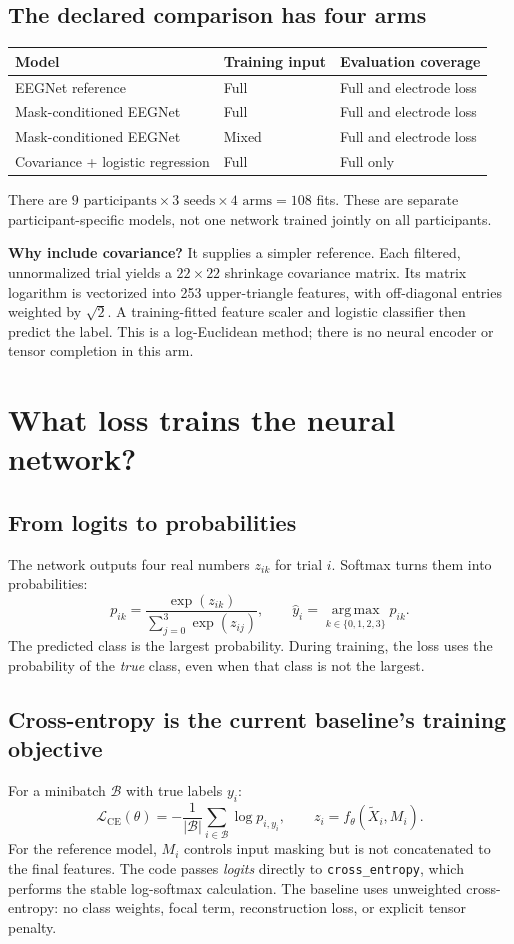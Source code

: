 \documentclass[11pt,a4paper]{article}
\newcommand{\code}[1]{{\small\nolinkurl{#1}}}
\begin{document}
\subsection*{The declared comparison has four arms}
\begin{tabularx}{\linewidth}{@{}YL{32mm}L{39mm}@{}}
\toprule
Model & Training input & Evaluation coverage \\
\midrule
EEGNet reference & Full & Full and electrode loss \\
Mask-conditioned EEGNet & Full & Full and electrode loss \\
Mask-conditioned EEGNet & Mixed & Full and electrode loss \\
Covariance + logistic regression & Full & Full only \\
\bottomrule
\end{tabularx}
There are $9\text{ participants}\times3\text{ seeds}\times4\text{ arms}=108$
fits. These are separate participant-specific models, not one network trained
jointly on all participants.

\textbf{Why include covariance?} It supplies a simpler reference. Each filtered,
unnormalized trial yields a $22\times22$ shrinkage covariance matrix. Its matrix
logarithm is vectorized into 253 upper-triangle features, with off-diagonal
entries weighted by $\sqrt2$. A training-fitted feature scaler and logistic
classifier then predict the label. This is a log-Euclidean method; there is no
neural encoder or tensor completion in this arm.

\newpage
\section{What loss trains the neural network?}
\subsection*{From logits to probabilities}
The network outputs four real numbers $z_{ik}$ for trial $i$. Softmax turns them
into probabilities:
\[
p_{ik}=\frac{\exp(z_{ik})}{\sum_{j=0}^{3}\exp(z_{ij})},
\qquad \widehat y_i=\operatorname*{arg\,max}_{k\in\{0,1,2,3\}}p_{ik}.
\]
The predicted class is the largest probability. During training, the loss uses
the probability of the \emph{true} class, even when that class is not the largest.

\subsection*{Cross-entropy is the current baseline's training objective}
For a minibatch $\mathcal B$ with true labels $y_i$:
\[
\boxed{\quad \mathcal L_{\mathrm{CE}}(\theta)
 =-\frac{1}{|\mathcal B|}\sum_{i\in\mathcal B}
 \log p_{i,y_i},\qquad
 z_i=f_\theta(\widetilde X_i,M_i).\quad}
\]
For the reference model, $M_i$ controls input masking but is not concatenated
to the final features. The code passes \emph{logits} directly to
\code{cross_entropy}, which performs the stable log-softmax calculation.
The baseline uses unweighted cross-entropy: no class weights, focal term,
reconstruction loss, or explicit tensor penalty.
\end{document}
